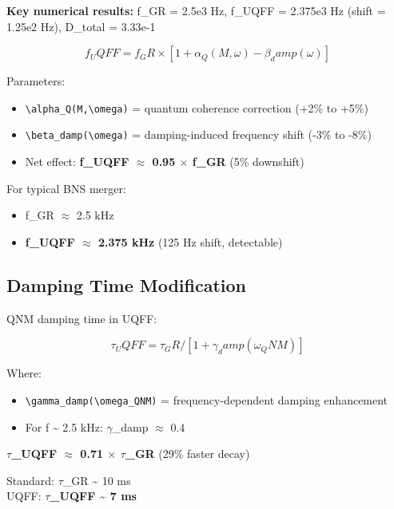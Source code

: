 \documentclass[12pt,a4paper]{article}
\begin{document}
\textbf{Key numerical results:} f\_GR = 2.5e3 Hz, f\_UQFF = 2.375e3 Hz (shift = 1.25e2 Hz), D\_total = 3.33e-1

\begin{equation}
f_UQFF = f_GR \times [1 + \alpha_Q(M,\omega) - \beta_damp(\omega)]
\end{equation}

Parameters:

\begin{itemize}
  \item \texttt{\textbackslash alpha\_Q(M,\textbackslash omega)} = quantum coherence correction (+2\% to +5\%)
  \item \texttt{\textbackslash beta\_damp(\textbackslash omega)} = damping-induced frequency shift (-3\% to -8\%)
  \item Net effect: \textbf{f\_UQFF $\approx$ 0.95 $\times$ f\_GR} (5\% downshift)
\end{itemize}

For typical BNS merger:

\begin{itemize}
  \item f\_GR $\approx$ 2.5 kHz
  \item \textbf{f\_UQFF $\approx$ 2.375 kHz} (125 Hz shift, detectable)
\end{itemize}

\subsection{Damping Time Modification}

QNM damping time in UQFF:

\begin{equation}
\tau_UQFF = \tau_GR / [1 + \gamma_damp(\omega_QNM)]
\end{equation}

Where:

\begin{itemize}
  \item \texttt{\textbackslash gamma\_damp(\textbackslash omega\_QNM)} = frequency-dependent damping enhancement
  \item For f \textasciitilde{} 2.5 kHz: $\gamma$\_damp $\approx$ 0.4
\end{itemize}

\textbf{$\tau$\_UQFF $\approx$ 0.71 $\times$ $\tau$\_GR} (29\% faster decay)

Standard: $\tau$\_GR \textasciitilde{} 10 ms \\  UQFF: \textbf{$\tau$\_UQFF \textasciitilde{} 7 ms}
\end{document}
